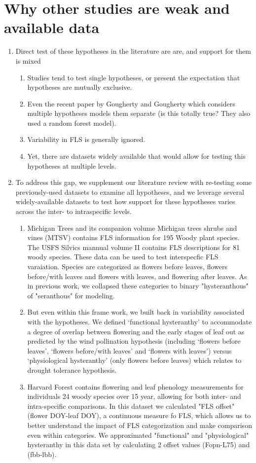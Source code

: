 \documentclass[12pt]{article}\usepackage[]{graphicx}\usepackage[]{color}
\begin{document}
\section*{ Why other studies are weak and available data}
\begin{enumerate}
\item Direct test of these hypotheses in the literature are are, and support for them is mixed
\begin{enumerate}
\item Studies tend to test single hypotheses, or present the expectation that hypotheses are mutually exclusive.
\item Even the recent paper by Gougherty and Gougherty which considers multiple hypotheses models them separate (is this totally true? They also used a random forest model).
\item Variability in FLS is generally ignored.
\item Yet, there are datasets widely available that would allow for testing this hypotheses at multiple levels.
\end{enumerate}
\item To address this gap, we supplement our literature review with re-testing some previously-used datasets to examine all hypotheses, and we leverage several widely-available datasets to test how support for these hypotheses varies across the inter- to intraspecific levels.
\begin{enumerate}
\item  Michigan Trees and its companion volume Michigan trees shrubs and vines (MTSV) contains FLS information for 195 Woody plant species. The USFS Silvics mannual volume II contains FLS descriptions for 81 woody species. These data can be used to test interspecfic FLS varaiation.  Species are categorized as flowers before leaves, flowers before/with leaves and flowers with leaves, and flowering after leaves. As in previous work, we collapsed these categories to binary "hysteranthous" of "seranthous" for modeling. 
\item But even within this frame work, we built back in variability associated with the hypotheses. We defined `functional hysteranthy' to accommodate a degree of overlap between flowering and the early stages of leaf out as predicted by the wind pollination hypothesis (including `flowers before leaves', `flowers before/with leaves' and `flowers with leaves') versus `physiological hysteranthy' (only flowers before leaves) which relates to drought tolerance hypothesis.
\item Harvard Forest contains flowering and leaf phenology measurements for individuals 24 woody species over 15 year, allowing for both inter- and intra-specific comparisons. In this dataset we calculated "FLS offset" (flower DOY-leaf DOY), a continuous measure fo FLS, which allows us to better understand the impact of FLS categorization and make comparison even within categories. We approximated "functional" and "physiological" hysteranthy in this data set by calculating 2 offset values (Fopn-L75) and (fbb-lbb).

\end{enumerate}
\end{enumerate}
\end{document}

